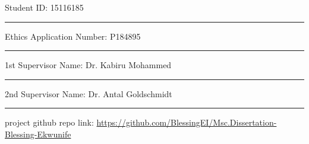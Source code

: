 \documentclass[12pt,oneside]{book}
\begin{document}
\noindent Student ID: 15116185\\[1mm]
\rule[1em]{25em}{0.5pt}

\noindent Ethics Application Number: P184895\\[1mm]
\rule[1em]{25em}{0.5pt}

\noindent 1st Supervisor Name: Dr. Kabiru Mohammed\\[1mm]
\rule[1em]{25em}{0.5pt}

\noindent 2nd Supervisor Name: Dr. Antal Goldschmidt\\[1mm]
\rule[1em]{25em}{0.5pt}

% 


\newpage





\tableofcontents
\listoffigures
\listoftables



\mainmatter





% 





\renewcommand{\bibname}{References}


 

\appendix

% 


%   
%   


project github repo link: \href{https://github.com/BlessingEI/Msc.Dissertation-Blessing-Ekwunife}{https://github.com/BlessingEI/Msc.Dissertation-Blessing-Ekwunife} 
\end{document}
